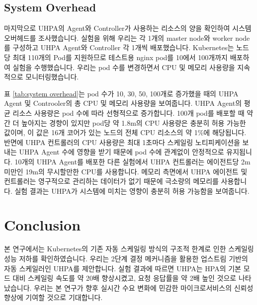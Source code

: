 \documentclass[conference]{IEEEtran}
\begin{document}
\subsection{System Overhead}
마지막으로 UHPA의 Agent와 Controller가 사용하는 리소스의 양을 확인하여 시스템 오버헤드를 조사했습니다. 실험을 위해 우리는 각 1개의 master node와 worker node를 구성하고 UHPA Agent와 Controller 각 1개씩 배포했습니다. Kubernetes는 노드당 최대 110개의 Pod를 지원하므로\cite{KubernetesLargeClusterBestPractices} 테스트용 nginx pod를 10에서 100개까지 배포하여 실험을 수행했습니다.  우리는 pod 수를 변경하면서 CPU 및 메모리 사용량을 지속적으로 모니터링했습니다.

표 \ref{tab:system overhead}는 pod 수가 10, 30, 50, 100개로 증가했을 때의 UHPA Agent 및 Controoler의 총 CPU 및 메모리 사용량을 보여줍니다. UHPA Agent의 평균 리소스 사용량은 pod 수에 따라 선형적으로 증가합니다. 100개 pod를 배포할 때 약간 더 높아지는 경향이 있지만 pod당 약 1.8m의 CPU 사용량은 충분히 허용 가능한 값이며, 이 값은 16개 코어가 있는 노드의 전체 CPU 리소스의 약 1\%에 해당됩니다. 반면에 UHPA 컨트롤러의 CPU 사용량은 최대 1초마다 스케일링 노티피케이션을 보내는 UHPA Agent 수에 영향을 받기 때문에 pod 수에 관계없이 안정적으로 유지됩니다. 10개의 UHPA Agent를 배포한 다른 실험에서 UHPA 컨트롤러는 에이전트당 2m 미만인 19m의 무시할만한 CPU를 사용합니다. 메모리 측면에서 UHPA 에이전트 및 컨트롤러는 영구적으로 관리하는 데이터가 없기 때문에 극소량의 메모리를 사용합니다. 실험 결과는 UHPA가 시스템에 미치는 영향이 충분히 허용 가능함을 보여줍니다.



\section{Conclusion}
본 연구에서는 Kubernetes의 기존 자동 스케일링 방식의 구조적 한계로 인한 스케일링 성능 저하를 확인하였습니다. 우리는 2단계 결정 메커니즘을 활용한 업스트림 기반의 자동 스케일러인 UHPA를 제안합니다. 실험 결과에 따르면 UHPA는 HPA의 기본 모드 대비 스케일링 속도를 약 20배 향상시켰고, 요청 응답률을 약 2배 높인 것으로 나타났습니다. 우리는 본 연구가 향후 실시간 수요 변화에 민감한 마이크로서비스의 신뢰성 향상에 기여할 것으로 기대합니다.







\vspace{12pt}
\end{document}
